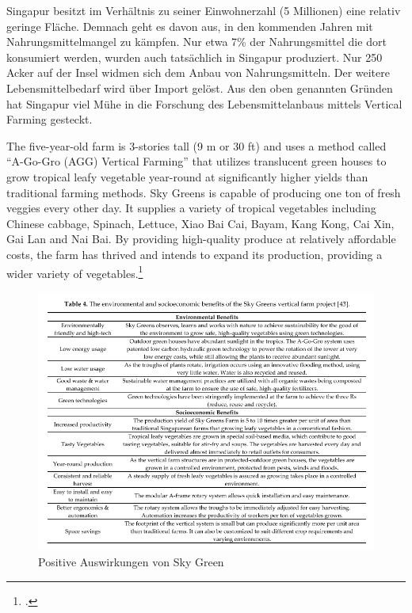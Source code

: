 \documentclass{scrartcl}
\begin{document}
Singapur besitzt im Verhältnis zu seiner Einwohnerzahl (5 Millionen)  eine relativ geringe Fläche. Demnach geht es davon aus, in den kommenden Jahren mit Nahrungsmittelmangel zu kämpfen. 
Nur etwa 7\% der Nahrungsmittel die dort konsumiert werden, wurden auch tatsächlich in Singapur produziert. Nur 250 Acker auf der Insel widmen sich dem Anbau von Nahrungsmitteln. Der weitere Lebensmittelbedarf wird über Import gelöst. Aus den oben genannten Gründen hat Singapur viel Mühe in die Forschung des Lebensmittelanbaus mittels Vertical Farming gesteckt. 
\begin{displayquote}
The five-year-old farm is 3-stories tall (9 m or 30 ft) and uses a method called “A-Go-Gro (AGG) Vertical Farming” that utilizes translucent green houses to grow tropical leafy vegetable year-round at significantly higher yields than traditional farming methods. Sky Greens is capable of producing one ton of fresh veggies every other day. It supplies a variety of tropical vegetables including Chinese cabbage, Spinach, Lettuce, Xiao Bai Cai, Bayam, Kang Kong, Cai Xin, Gai Lan and Nai Bai. By providing high-quality produce at relatively affordable costs, the farm has thrived and intends to expand its production, providing a wider variety of vegetables.\footcite[S.15]{Al-Kodmany2018TheCity}
\end{displayquote}

\begin{figure}[htbp]
\centering
\includegraphics[width=14cm]{image_folder/skygreenbenefits.png}
\caption{Positive Auswirkungen von Sky Green }
\label{fig:Positive Auswirkungen von Sky Green}
\end{figure}
\end{document}

